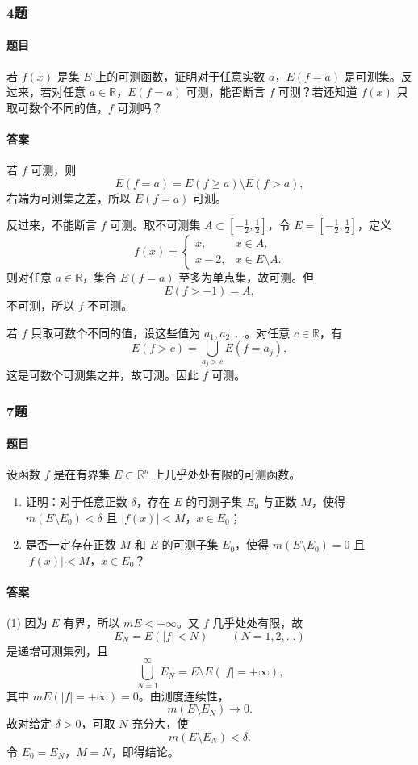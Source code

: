 \documentclass{article}
\begin{document}
	\subsubsection*{4题}
	\paragraph{题目} 若 $f(x)$ 是集 $E$ 上的可测函数，证明对于任意实数 $a$，$E(f=a)$ 是可测集。反过来，若对任意 $a\in\mathbb{R}$，$E(f=a)$ 可测，能否断言 $f$ 可测？若还知道 $f(x)$ 只取可数个不同的值，$f$ 可测吗？
	
	\paragraph{答案} 若 $f$ 可测，则
	\[
	E(f=a)=E(f\ge a)\setminus E(f>a),
	\]
	右端为可测集之差，所以 $E(f=a)$ 可测。
	
	反过来，不能断言 $f$ 可测。取不可测集 $A\subset[-\frac12,\frac12]$，令 $E=[-\frac12,\frac12]$，定义
	\[
	f(x)=
	\begin{cases}
		x, & x\in A,\\
		x-2, & x\in E\setminus A.
	\end{cases}
	\]
	则对任意 $a\in\mathbb{R}$，集合 $E(f=a)$ 至多为单点集，故可测。但
	\[
	E(f>-1)=A,
	\]
	不可测，所以 $f$ 不可测。
	
	若 $f$ 只取可数个不同的值，设这些值为 $a_1,a_2,\ldots$。对任意 $c\in\mathbb{R}$，有
	\[
	E(f>c)=\bigcup_{a_j>c}E(f=a_j),
	\]
	这是可数个可测集之并，故可测。因此 $f$ 可测。
	
	\subsubsection*{7题}
	\paragraph{题目} 设函数 $f$ 是在有界集 $E\subset\mathbb{R}^n$ 上几乎处处有限的可测函数。
	\begin{enumerate}[label=(\arabic*)]
		\item 证明：对于任意正数 $\delta$，存在 $E$ 的可测子集 $E_0$ 与正数 $M$，使得 $m(E\setminus E_0)<\delta$ 且 $|f(x)|<M$，$x\in E_0$；
		\item 是否一定存在正数 $M$ 和 $E$ 的可测子集 $E_0$，使得 $m(E\setminus E_0)=0$ 且 $|f(x)|<M$，$x\in E_0$？
	\end{enumerate}
	
	\paragraph{答案} (1) 因为 $E$ 有界，所以 $mE<+\infty$。又 $f$ 几乎处处有限，故
	\[
	E_N=E(|f|<N)\qquad(N=1,2,\ldots)
	\]
	是递增可测集列，且
	\[
	\bigcup_{N=1}^{\infty}E_N=E\setminus E(|f|=+\infty),
	\]
	其中 $mE(|f|=+\infty)=0$。由测度连续性，
	\[
	m(E\setminus E_N)\to0.
	\]
	故对给定 $\delta>0$，可取 $N$ 充分大，使
	\[
	m(E\setminus E_N)<\delta.
	\]
	令 $E_0=E_N$，$M=N$，即得结论。
	
\end{document}
